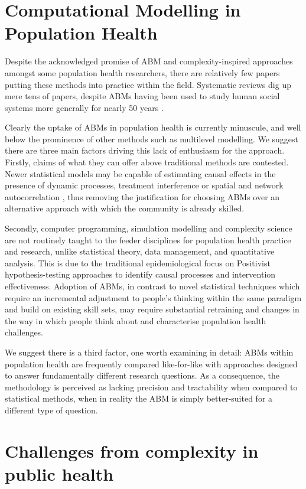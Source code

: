 \documentclass[review]{elsarticle}
\begin{document}
\section{Computational Modelling in Population Health}

Despite the acknowledged promise of ABM and complexity-inspired approaches amongst some population health researchers, there are relatively few papers putting these methods into practice within the field.  Systematic reviews dig up mere tens of papers, despite ABMs having been used to study human social systems more generally for nearly 50 years \citep{nianogo2015}. 

Clearly the uptake of ABMs in population health is currently minuscule, and well below the prominence of other methods such as multilevel modelling.  We suggest there are three main factors driving this lack of enthusiasm for the approach. Firstly, claims of what they can offer above traditional methods are contested. Newer statistical models may be capable of estimating causal effects in the presence of dynamic processes, treatment interference or spatial and network autocorrelation \citep{naimi2016}, thus removing the justification for choosing ABMs over an alternative approach with which the community is already skilled. 

Secondly, computer programming, simulation modelling and complexity science are not routinely taught to the feeder disciplines for population health practice and research, unlike  statistical theory, data management, and quantitative analysis.  This is due to the traditional epidemiological focus on Positivist hypothesis-testing approaches to identify causal processes and intervention effectiveness.  Adoption of ABMs, in contrast to novel statistical techniques which require an incremental adjustment to people's thinking within the same paradigm and build on existing skill sets, may require substantial retraining and changes in the way in which people think about and characterise population health challenges.

We suggest there is a third factor, one worth examining in detail: ABMs within population health are frequently compared like-for-like with approaches designed to answer fundamentally different research questions.  As a consequence, the methodology is perceived as lacking precision and tractability when compared to statistical methods, when in reality the ABM is simply better-suited for a different type of question.

\section{Challenges from complexity in public health}
\end{document}

